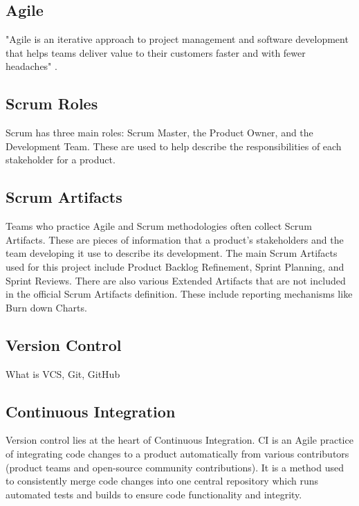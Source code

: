 \documentclass{article}
\begin{document}
\subsection{Agile}
"Agile is an iterative approach to project management and software development that helps teams deliver value to their customers faster and with fewer headaches" \cite{what-is-agile}. 



\subsection{Scrum Roles}
Scrum has three main roles: Scrum Master, the Product Owner, and the Development Team. These are used to help describe the responsibilities of each stakeholder for a product.



\subsection{Scrum Artifacts}
Teams who practice Agile and Scrum methodologies often collect Scrum Artifacts. These are pieces of information that a product's stakeholders and the team developing it use to describe its development. The main Scrum Artifacts used for this project include Product Backlog Refinement, Sprint Planning, and Sprint Reviews. There are also various Extended Artifacts that are not included in the official Scrum Artifacts definition. These include reporting mechanisms like Burn down Charts.



\subsection{Version Control}
What is VCS, Git, GitHub 



\subsection{Continuous Integration}
Version control lies at the heart of Continuous Integration. CI is an Agile practice of integrating code changes to a product automatically from various contributors (product teams and open-source community contributions). It is a method used to consistently merge code changes into one central repository which runs automated tests and builds to ensure code functionality and integrity.   
\end{document}
